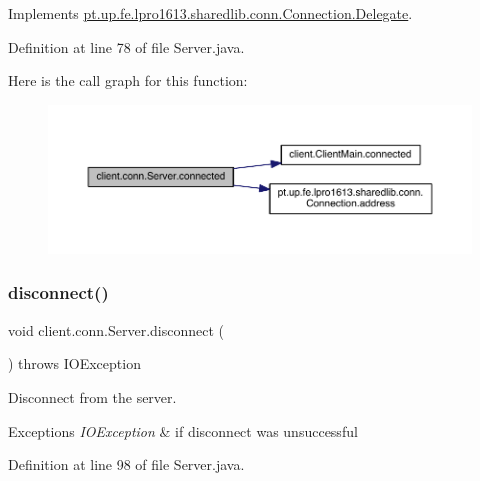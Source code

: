 Implements \hyperlink{interfacept_1_1up_1_1fe_1_1lpro1613_1_1sharedlib_1_1conn_1_1_connection_1_1_delegate_afeb3c54ced46916733df2ba0b0e2d87e}{pt.\+up.\+fe.\+lpro1613.\+sharedlib.\+conn.\+Connection.\+Delegate}.



Definition at line 78 of file Server.\+java.

Here is the call graph for this function\+:
\nopagebreak
\begin{figure}[H]
\begin{center}
\leavevmode
\includegraphics[width=350pt]{classclient_1_1conn_1_1_server_ac8ad09c9052bfb32e082493ada8d14ab_cgraph}
\end{center}
\end{figure}
\hypertarget{classclient_1_1conn_1_1_server_ab69a81693f41986321e92120aa0918cb}{}\label{classclient_1_1conn_1_1_server_ab69a81693f41986321e92120aa0918cb} 
\subsubsection{\texorpdfstring{disconnect()}{disconnect()}}
{\footnotesize\ttfamily void client.\+conn.\+Server.\+disconnect (\begin{DoxyParamCaption}{ }\end{DoxyParamCaption}) throws I\+O\+Exception}

Disconnect from the server. 
\begin{DoxyExceptions}{Exceptions}
{\em I\+O\+Exception} & if disconnect was unsuccessful \\
\hline
\end{DoxyExceptions}


Definition at line 98 of file Server.\+java.

